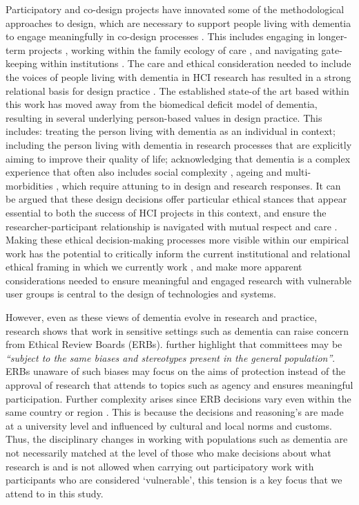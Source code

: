 Participatory and co-design projects have innovated some of the methodological approaches to design, which are necessary to support people living with dementia to engage meaningfully in co-design processes \citep{branco_personalised_2017}. This includes engaging in longer-term projects \citep{hendriks_challenges_2014}, working within the family ecology of care \citep{keady_involving_2007}, and navigating gate-keeping within institutions \citep{sanghera_methodological_2008}. The care and ethical consideration needed to include the voices of people living with dementia in HCI research has resulted in a strong relational basis for design practice \citep{bartlett_citizenship_2014,kontos_integrating_2018}. The established state-of the art based within this work has moved away from the biomedical deficit model of dementia, resulting in several underlying person-based values in design practice. This includes: treating the person living with dementia as an individual in context; including the person living with dementia in research processes that are explicitly aiming to improve their quality of life; acknowledging that dementia is a complex experience that often also includes social complexity \citep{keyes2019living}, ageing and multi-morbidities \citep{buse_materialising_2016}, which require attuning to in design and research responses. It can be argued that these design decisions offer particular ethical stances that appear essential to both the success of HCI projects in this context, and ensure the researcher-participant relationship is navigated with mutual respect and care \citep{foley_care_2019}. Making these ethical decision-making processes more visible within our empirical work has the potential to critically inform the current institutional and relational ethical framing in which we currently work \citep{oyebode_mental_2005}, and make more apparent considerations needed to ensure meaningful and engaged research with vulnerable user groups is central to the design of technologies and systems. 

However, even as these views of dementia evolve in research and practice, research shows that work in sensitive settings such as dementia can raise concern from Ethical Review Boards (ERBs). \cite{pachana_can_2014} further highlight that committees may be \textit{“subject to the same biases and stereotypes present in the general population”}. ERBs unaware of such biases may focus on the aims of protection instead of the approval of research that attends to topics such as agency and ensures meaningful participation. Further complexity arises since ERB decisions vary even within the same country or region \citep{edwards_research_2004}. This is because the decisions and reasoning's are made at a university level and influenced by cultural and local norms and customs. Thus, the disciplinary changes in working with populations such as dementia are not necessarily matched at the level of those who make decisions about what research is and is not allowed when carrying out participatory work with participants who are considered ‘vulnerable’, this tension is a key focus that we attend to in this study.

